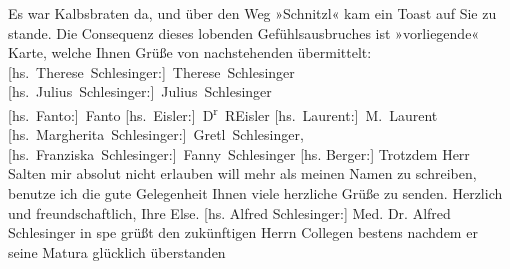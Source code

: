 \begin{ledgroupsized}[t]{13cm}
               Es war Kalbsbraten da, und über den Weg »Schnitzl« kam ein Toast auf Sie zu stande.
               Die Consequenz dieses lobenden Gefühlsausbruches ist »vorliegende« Karte, welche
               Ihnen Grüße von nachstehenden \label{K_L03177-1v}\label{K_L03177-1h} übermittelt:\pend
           \pstart
           \spacefill\mbox{{[}hs. Therese Schlesinger:{]} Therese Schlesinger}{ }\spacefill\mbox{{[}hs. Julius Schlesinger:{]} Julius Schlesinger}{\\}\spacefill\mbox{{[}hs. Fanto:{]} Fanto}{ }\spacefill\mbox{{[}hs. Eisler:{]} D\textsuperscript{r} REisler}{ }\spacefill\mbox{{[}hs. Laurent:{]} M. Laurent}{\\}\spacefill\mbox{{[}hs. Margherita Schlesinger:{]} Gretl Schlesinger,}{ }\spacefill\mbox{{[}hs. Franziska Schlesinger:{]} Fanny Schlesinger}\pend
           \pstart
           {[}hs. Berger:{]} Trotzdem Herr Salten mir absolut nicht erlauben \introOben{}will\introOben{} mehr als meinen Namen zu schreiben, benutze ich die gute
               Gelegenheit Ihnen viele herzliche Grüße zu senden. Herzlich und freundschaftlich,
               Ihre \spacefill\mbox{Else.}\pend
           \pstart
           {[}hs. Alfred Schlesinger:{]} Med. Dr. Alfred Schlesinger \introOben{}in
                  spe\introOben{} grüßt den zukünftigen Herrn Collegen bestens nachdem er seine Matura
               glücklich überstanden\pend
           \pstart
           \noindent{}\label{T_L03177-1v}\label{T_L03177-1h}\pend
           
         
         \endnumbering{}\end{ledgroupsized}  \newcommand{\dateiname}{L03177}\newcommand{\titel}{Felix Salten u. a. an Arthur Schnitzler, 6. 8. 1896}\newcommand{\editorInnen}{Martin Anton Müller und Laura Untner}
      